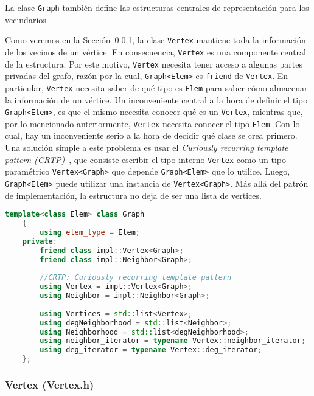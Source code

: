 \documentclass[%
    a4paper,%
    12pt,%
    twoside,%
    openright,%
    halfparskip,%
    cleardoubleempty,%
    bigheadings,%
    titlepage,%
    headsepline%
]{scrbook}
\makeatletter
\newcommand{\Code}[1]{\lstinline[basicstyle={\tt}]@#1@}
\makeatother
\begin{document}
La clase \Code{Graph} también define las estructuras centrales de representación para los vecindarios


Como veremos en la Sección~\ref{sec:c++:estructura:Vertex.h}, la clase \Code{Vertex} mantiene toda la información de los vecinos de un vértice.  En consecuencia, \Code{Vertex} es una componente central de la estructura.  Por este motivo, \Code{Vertex} necesita tener acceso a algunas partes privadas del grafo, razón por la cual, \Code{Graph<Elem>} es \Code{friend} de \Code{Vertex}.  En particular, \Code{Vertex} necesita saber de qué tipo es \Code{Elem} para saber cómo almacenar la información de un vértice.  Un inconveniente central a la hora de definir el tipo \Code{Graph<Elem>}, es que el mismo necesita conocer qué es un \Code{Vertex}, mientras que, por lo mencionado anteriormente, \Code{Vertex} necesita conocer el tipo \Code{Elem}.  Con lo cual, hay un inconveniente serio a la hora de decidir qué clase se crea primero.  Una solución simple a este problema es usar el \emph{Curiously recurring template pattern (CRTP)}~\cite{}, que consiste escribir el tipo interno \Code{Vertex} como un tipo paramétrico \Code{Vertex<Graph>} que depende \Code{Graph<Elem>} que lo utilice.  Luego, \Code{Graph<Elem>} puede utilizar una instancia de \Code{Vertex<Graph>}.  Más allá del patrón de implementación, la estructura no deja de ser una lista de vertices.


\begin{lstlisting}[language={C++},caption={Estructura del tipo Grafo en C++.},gobble=2,float=ht,label={lst:c++:graph}]
    template<class Elem> class Graph
    {
        using elem_type = Elem;
    private:
        friend class impl::Vertex<Graph>;
        friend class impl::Neighbor<Graph>;
    
        //CRTP: Curiously recurring template pattern
        using Vertex = impl::Vertex<Graph>; 
        using Neighbor = impl::Neighbor<Graph>;
        
        using Vertices = std::list<Vertex>;
        using degNeighborhood = std::list<Neighbor>;
        using Neighborhood = std::list<degNeighborhood>;
        using neighbor_iterator = typename Vertex::neighbor_iterator;
        using deg_iterator = typename Vertex::deg_iterator;
    };
\end{lstlisting}

\subsubsection{Vertex (Vertex.h)}
\label{sec:c++:estructura:Vertex.h}
\end{document}
